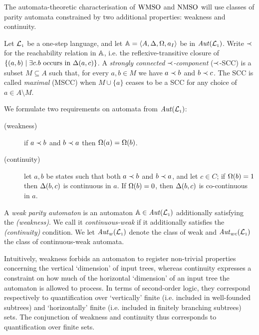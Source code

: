 The automata-theoretic characterisation of $\mathrm{WMSO}$ and $\mathrm{NMSO}$ will use classes of parity automata constrained by two additional properties: weakness
and continuity. 

\begin{definition}
\label{def:weak}
Let $\mathcal{L}_{\scriptscriptstyle 1}$ be a one-step language, and let $\mathbb{A} = \langle{A,\Delta,\Omega,a_I}\rangle$
be in $\mathit{Aut}(\mathcal{L}_{\scriptscriptstyle 1})$. Write $\prec$ for the reachability relation in $\mathbb{A}$, i.e. the reflexive-transitive closure of $\{ (a,b) \mid \exists c. b \text{ occurs in }\tmap(a,c)\}$. A \emph{strongly connected $\prec$-component} ($\prec$-SCC) is a subset $M\subseteq A$ such that, for every $a,b \in M$ we have $a \prec b$ and $b \prec c$. The SCC is called \emph{maximal} (MSCC) when $M\cup\{a\}$ ceases to be a SCC for any choice of $a \in A\setminus M$.


We formulate two requirements on automata from $\mathit{Aut}(\mathcal{L}_{\scriptscriptstyle 1})$:
\begin{description}
\item[(weakness)] if $a \prec b$ and $b \prec a$ then $\Omega(a) = \Omega(b)$.
\item[(continuity)] let $a,b$ be states such that both $a\prec b$ and
$b \prec a$, and let $c\in C$;
    if ${\Omega(b)}=1$ then $\Delta(b,c)$ is continuous in $a$.
    If $\Omega(b)=0$, then $\Delta(b,c)$ is co-continuous in $a$.
\end{description}
A \emph{weak parity automaton} is an automaton $\mathbb{A} \in \mathit{Aut}(\mathcal{L}_{\scriptscriptstyle 1})$ additionally satisfying the \emph{(weakness)}. We call it \emph{continuous-weak} if it additionally satisfies the \emph{(continuity)} condition. We let $\mathit{Aut}_{w}(\mathcal{L}_{\scriptscriptstyle 1})$ denote the class of weak and $\mathit{Aut}_{wc}(\mathcal{L}_{\scriptscriptstyle 1})$  the class of continuous-weak automata.
\end{definition}


Intuitively, weakness forbids an automaton to register non-trivial properties concerning the vertical `dimension' of input trees, whereas continuity expresses a constraint on how much of the horizontal `dimension' of an input tree the automaton is allowed to process. In terms of second-order logic, they correspond respectively to quantification over `vertically' finite (i.e. included in well-founded subtrees) and `horizontally' finite (i.e. included in finitely branching subtrees) sets. The conjunction of weakness and continuity thus corresponds to quantification over finite sets. 


